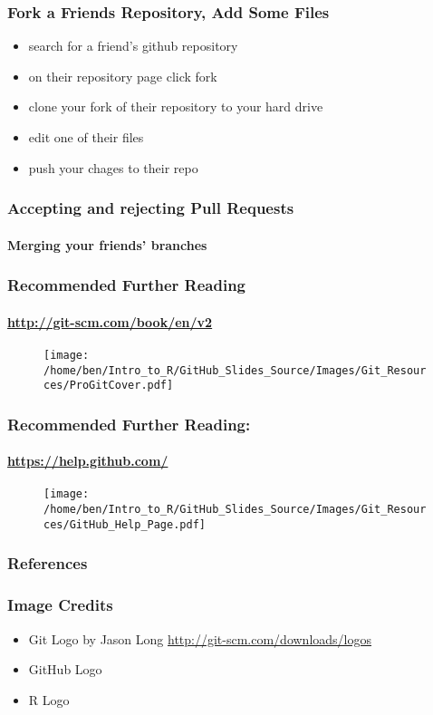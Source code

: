 \documentclass[xcolor=dvipsnames]{beamer}
\begin{document}
\begin{frame}
\frametitle{Fork a Friends Repository, Add Some Files}
\begin{itemize}
\item search for a friend's github repository
\item on their repository page click fork
\item clone your fork of their repository to your hard drive
\item edit one of their files
\item push your chages to their repo
\end{itemize}
\end{frame}

\begin{frame}
\frametitle{Accepting and rejecting Pull Requests}
\framesubtitle{Merging your friends' branches}
\end{frame}

\begin{frame}
\frametitle{Recommended Further Reading}
\framesubtitle{\url{http://git-scm.com/book/en/v2}}
\begin{center}
\begin{figure}
\texttt{[image: /home/ben/Intro\_to\_R/GitHub\_Slides\_Source/Images/Git\_Resources/ProGitCover.pdf]}
\end{figure}
\cite{Chacon2014}
\end{center}

\end{frame}

\begin{frame}
\frametitle{Recommended Further Reading:}
\framesubtitle{\url{https://help.github.com/}}
%
\begin{center}
\begin{figure}
\texttt{[image: /home/ben/Intro\_to\_R/GitHub\_Slides\_Source/Images/Git\_Resources/GitHub\_Help\_Page.pdf]}
\end{figure}

\end{center}

\end{frame}


\begin{frame}
\frametitle{References}


\end{frame}

\begin{frame}
\frametitle{Image Credits}
\begin{itemize}
\item Git Logo by Jason Long \url{http://git-scm.com/downloads/logos}
\item GitHub Logo 
\item R Logo
\end{itemize}
\end{frame}
\end{document}
